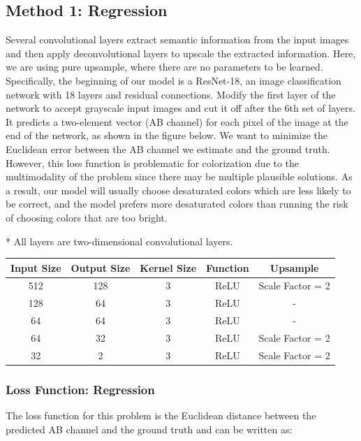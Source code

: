 \documentclass{article}
\begin{document}
\subsection{Method 1: Regression}
Several convolutional layers extract semantic information from the input images and then apply deconvolutional layers to upscale the extracted information.
Here, we are using pure upsample, where there are no parameters to be learned.
Specifically, the beginning of our model is a ResNet-18, an image classification network with 18 layers and residual connections. 
Modify the first layer of the network to accept grayscale input images and cut it off after the 6th set of layers. 
It predicts a two-element vector (AB channel) for each pixel of the image at the end of the network, as shown in the figure below. We want to minimize the Euclidean error between the AB channel we estimate and the ground truth. However, this loss function is problematic for colorization due to the multimodality of the problem since there may be multiple plausible solutions.
As a result, our model will usually choose desaturated colors which are less likely to be correct, and the model prefers more desaturated colors than running the risk of choosing colors that are too bright.

* All layers are two-dimensional convolutional layers.

\begin{center}
    \begin{tabular}{ |c|c|c|c|c| } 
    \hline
    Input Size & Output Size & Kernel Size & Function & Upsample \\
    \hline
    512 & 128 & 3 & ReLU & Scale Factor = 2 \\ 
    128 & 64 & 3 & ReLU & - \\ 
    64 & 64 & 3 & ReLU &  - \\ 
    64 & 32 & 3 & ReLU & Scale Factor = 2 \\ 
    32 & 2 & 3 & ReLU & Scale Factor = 2 \\ 
    
    \hline
    
    \end{tabular}
    
    \end{center}


\subsubsection{Loss Function: Regression}
The loss function for this problem is the Euclidean distance between the predicted AB channel and the ground truth and can be written as:
\end{document}
